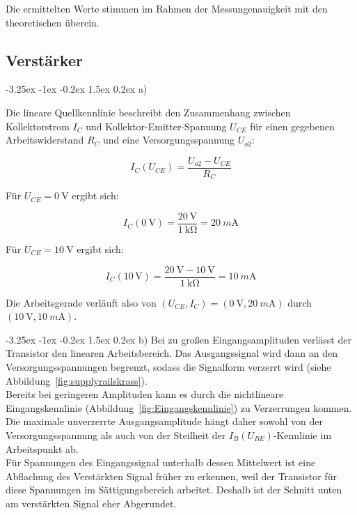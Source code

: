 \documentclass[
	a4paper, %
	12pt, %
]{CSUniSchoolLabReport}
\makeatletter
\renewcommand\paragraph{\@startsection{paragraph}{4}{\z@}%
  {-3.25ex \@plus -1ex \@minus -0.2ex}%
  {1.5ex \@plus 0.2ex}%
  {\normalfont\normalsize\bfseries}}
\newcommand{\milli}{m}
\makeatother
\begin{document}
\vspace{2em}
Die ermittelten Werte stimmen im Rahmen der Messungenauigkeit mit den theoretischen überein.

\subsection{Verstärker}
\paragraph{a)}

Die lineare Quellkennlinie beschreibt den Zusammenhang zwischen Kollektorstrom $I_C$ und Kollektor-Emitter-Spannung $U_{CE}$ für einen gegebenen Arbeitswiderstand $R_C$ und eine Versorgungsspannung $U_{o2}$:

\[
I_C(U_{CE}) = \frac{U_{o2} - U_{CE}}{R_C}
\]

Für $U_{CE} = \SI{0}{\volt}$ ergibt sich:

\[
I_C(\SI{0}{\volt}) = \frac{\SI{20}{\volt}}{\SI{1}{\kilo\ohm}} = \SI{20}{\milli\ampere}
\]

Für $U_{CE} = \SI{10}{\volt}$ ergibt sich:

\[
I_C(10\,\mathrm{V}) = \frac{\SI{20}{\volt}- \SI{10}{\volt}}{\SI{1}{\kilo\ohm}} = \SI{10}{\milli\ampere}
\]

\vspace{1em}
Die Arbeitsgerade verläuft also von $(U_{CE}, I_C) = (\SI{0}{\volt}, \SI{20}{\milli\ampere})$ durch $(\SI{10}{\volt}, \SI{10}{\milli\ampere})$.

\paragraph{b)}
Bei zu großen Eingangsamplituden verlässt der Transistor den linearen Arbeitsbereich. Das Ausgangssignal wird dann an den Versorgungsspannungen begrenzt, sodass die Signalform verzerrt wird (siehe Abbildung~\ref{fig:supplyrailskrass}).\\
Bereits bei geringeren Amplituden kann es durch die nichtlineare Eingangskennlinie (Abbildung~\ref{fig:Eingangskennlinie}) zu Verzerrungen kommen. Die maximale unverzerrte Ausgangsamplitude hängt daher sowohl von der Versorgungsspannung als auch von der Steilheit der $I_B(U_{BE})$-Kennlinie im Arbeitspunkt ab.\\ 
Für Spannungen des Eingangssignal unterhalb dessen Mittelwert ist eine Abflachung des Verstärkten Signal früher zu erkennen, weil der Transistor für diese Spannungen im Sättigungsbereich arbeitet. Deshalb ist der Schnitt unten am verstärkten Signal eher Abgerundet. 
\end{document}
